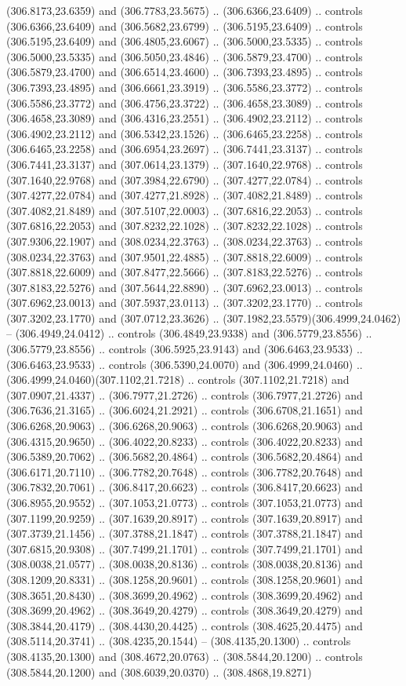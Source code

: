 (306.8173,23.6359) and (306.7783,23.5675) .. (306.6366,23.6409) .. controls (306.6366,23.6409) and (306.5682,23.6799) .. (306.5195,23.6409) .. controls (306.5195,23.6409) and (306.4805,23.6067) .. (306.5000,23.5335) .. controls (306.5000,23.5335) and (306.5050,23.4846) .. (306.5879,23.4700) .. controls (306.5879,23.4700) and (306.6514,23.4600) .. (306.7393,23.4895) .. controls (306.7393,23.4895) and (306.6661,23.3919) .. (306.5586,23.3772) .. controls (306.5586,23.3772) and (306.4756,23.3722) .. (306.4658,23.3089) .. controls (306.4658,23.3089) and (306.4316,23.2551) .. (306.4902,23.2112) .. controls (306.4902,23.2112) and (306.5342,23.1526) .. (306.6465,23.2258) .. controls (306.6465,23.2258) and (306.6954,23.2697) .. (306.7441,23.3137) .. controls (306.7441,23.3137) and (307.0614,23.1379) .. (307.1640,22.9768) .. controls (307.1640,22.9768) and (307.3984,22.6790) .. (307.4277,22.0784) .. controls (307.4277,22.0784) and (307.4277,21.8928) .. (307.4082,21.8489) .. controls (307.4082,21.8489) and (307.5107,22.0003) .. (307.6816,22.2053) .. controls (307.6816,22.2053) and (307.8232,22.1028) .. (307.8232,22.1028) .. controls (307.9306,22.1907) and (308.0234,22.3763) .. (308.0234,22.3763) .. controls (308.0234,22.3763) and (307.9501,22.4885) .. (307.8818,22.6009) .. controls (307.8818,22.6009) and (307.8477,22.5666) .. (307.8183,22.5276) .. controls (307.8183,22.5276) and (307.5644,22.8890) .. (307.6962,23.0013) .. controls (307.6962,23.0013) and (307.5937,23.0113) .. (307.3202,23.1770) .. controls (307.3202,23.1770) and (307.0712,23.3626) .. (307.1982,23.5579)(306.4999,24.0462) -- (306.4949,24.0412) .. controls (306.4849,23.9338) and (306.5779,23.8556) .. (306.5779,23.8556) .. controls (306.5925,23.9143) and (306.6463,23.9533) .. (306.6463,23.9533) .. controls (306.5390,24.0070) and (306.4999,24.0460) .. (306.4999,24.0460)(307.1102,21.7218) .. controls (307.1102,21.7218) and (307.0907,21.4337) .. (306.7977,21.2726) .. controls (306.7977,21.2726) and (306.7636,21.3165) .. (306.6024,21.2921) .. controls (306.6708,21.1651) and (306.6268,20.9063) .. (306.6268,20.9063) .. controls (306.6268,20.9063) and (306.4315,20.9650) .. (306.4022,20.8233) .. controls (306.4022,20.8233) and (306.5389,20.7062) .. (306.5682,20.4864) .. controls (306.5682,20.4864) and (306.6171,20.7110) .. (306.7782,20.7648) .. controls (306.7782,20.7648) and (306.7832,20.7061) .. (306.8417,20.6623) .. controls (306.8417,20.6623) and (306.8955,20.9552) .. (307.1053,21.0773) .. controls (307.1053,21.0773) and (307.1199,20.9259) .. (307.1639,20.8917) .. controls (307.1639,20.8917) and (307.3739,21.1456) .. (307.3788,21.1847) .. controls (307.3788,21.1847) and (307.6815,20.9308) .. (307.7499,21.1701) .. controls (307.7499,21.1701) and (308.0038,21.0577) .. (308.0038,20.8136) .. controls (308.0038,20.8136) and (308.1209,20.8331) .. (308.1258,20.9601) .. controls (308.1258,20.9601) and (308.3651,20.8430) .. (308.3699,20.4962) .. controls (308.3699,20.4962) and (308.3699,20.4962) .. (308.3649,20.4279) .. controls (308.3649,20.4279) and (308.3844,20.4179) .. (308.4430,20.4425) .. controls (308.4625,20.4475) and (308.5114,20.3741) .. (308.4235,20.1544) -- (308.4135,20.1300) .. controls (308.4135,20.1300) and (308.4672,20.0763) .. (308.5844,20.1200) .. controls (308.5844,20.1200) and (308.6039,20.0370) .. (308.4868,19.8271) 